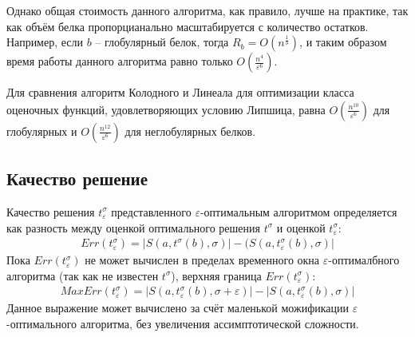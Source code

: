 \documentclass[a4papper]{article}
\newcommand{\lp}{\left(}
\newcommand{\rp}{\right)}
\newcommand{\eps}{\varepsilon}
\begin{document}
Однако общая стоимость данного алгоритма, как правило, лучше на практике, так как объём белка пропорцианально масштабируется с количество остатков. Например, если $b$ -- глобулярный белок, тогда $R_b = O(n^\frac{1}{3})$, и таким образом время работы данного алгоритма равно только $O\lp\frac{n^4}{\eps^6}\rp$.

Для сравнения алгоритм Колодного и Линеала для оптимизации класса оценочных функций, удовлетворяющих условию Липшица, равна $O \lp \frac{n^{10}}{\eps^6} \rp$ для глобулярных и $O \lp \frac{n^{12}}{\eps^6} \rp$ для неглобулярных белков.

\subsection{ Качество решение}
Качество решения $t_\eps^\sigma$ представленного $\eps$-оптимальным алгоритмом определяется как разность между оценкой оптимального решения $t^\sigma$ и оценкой $t_\eps^\sigma$:
\begin{gather}
Err(t_\eps^\sigma ) = |S(a, t^\sigma (b), \sigma) | - (S(a, t_\eps^\sigma (b), \sigma)|
\end{gather}
Пока $Err(t_\eps^\sigma)$ не может вычислен в пределах временного окна $\eps$-оптималбного алгоритма (так как не известен $t^\sigma$), верхняя граница $Err(t_\eps^\sigma)$:
\begin{gather}
MaxErr(t_\eps^\sigma ) = |S(a, t_\eps^\sigma (b), \sigma + \eps)| - |S(a, t_\eps^\sigma(b), \sigma)|
\end{gather}
Данное выражение может вычислено за счёт маленькой можификации $\eps$-оптимального алгоритма, без увеличения ассимптотической сложности.
\end{document}
